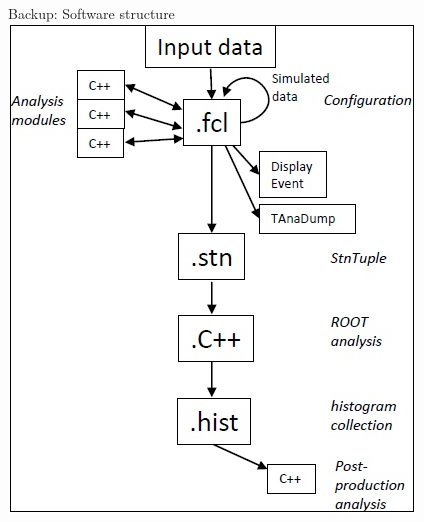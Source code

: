 \documentclass[10pt]{beamer}
\begin{document}
\begin{frame}{Backup: Software structure}
\centering
\includegraphics[height=0.8\textheight]{mu2e_datahandling}
\end{frame}


\begin{frame}
\printbibliography
\end{frame}
\end{document}

